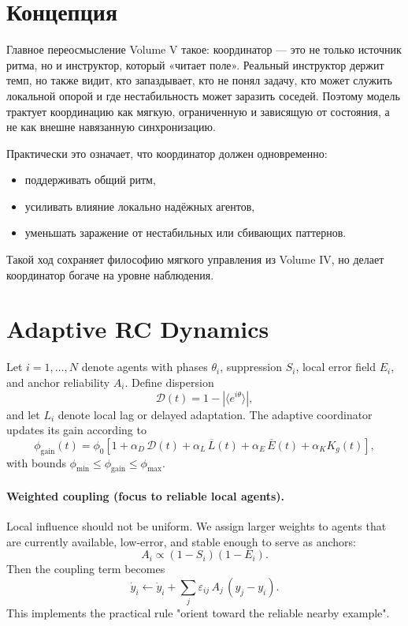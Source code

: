 ﻿\documentclass[12pt,a4paper]{article}
\begin{document}
\section{Концепция}
Главное переосмысление Volume V такое: координатор — это не только источник ритма, но и инструктор, который «читает поле». Реальный инструктор держит темп, но также видит, кто запаздывает, кто не понял задачу, кто может служить локальной опорой и где нестабильность может заразить соседей. Поэтому модель трактует координацию как мягкую, ограниченную и зависящую от состояния, а не как внешне навязанную синхронизацию.

Практически это означает, что координатор должен одновременно:
\begin{itemize}
    \item поддерживать общий ритм,
    \item усиливать влияние локально надёжных агентов,
    \item уменьшать заражение от нестабильных или сбивающих паттернов.
\end{itemize}
Такой ход сохраняет философию мягкого управления из Volume IV, но делает координатор богаче на уровне наблюдения.

\section{Adaptive RC Dynamics}
Let $i=1,\dots,N$ denote agents with phases $\theta_i$, suppression $S_i$, local error field $E_i$, and anchor reliability $A_i$. Define dispersion
\begin{equation}
\mathcal{D}(t)=1-\left|\langle e^{i\theta}\rangle\right|,
\end{equation}
and let $L_i$ denote local lag or delayed adaptation. The adaptive coordinator updates its gain according to
\begin{equation}
\phi_{\mathrm{gain}}(t)=\phi_0\left[1+\alpha_D\,\mathcal{D}(t)+\alpha_L\,\overline{L}(t)+\alpha_E\,\overline{E}(t)+\alpha_K K_g(t)\right],
\end{equation}
with bounds $\phi_{\min}\le\phi_{\mathrm{gain}}\le\phi_{\max}$.

\paragraph{Weighted coupling (focus to reliable local agents).}
Local influence should not be uniform. We assign larger weights to agents that are currently available, low-error, and stable enough to serve as anchors:
\begin{equation}
A_i \propto (1-S_i)(1-E_i).
\end{equation}
Then the coupling term becomes
\begin{equation}
\dot{y}_i\leftarrow \dot{y}_i + \sum_j \varepsilon_{ij}\,A_j\,(y_j-y_i).
\end{equation}
This implements the practical rule "orient toward the reliable nearby example".
\end{document}
